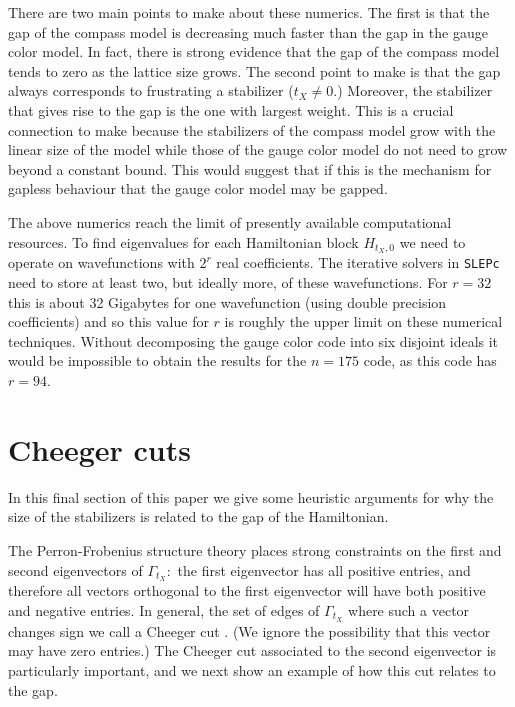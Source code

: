 \documentclass[11pt,oneside]{article}
\begin{document}
There are two main points to make about these numerics.
The first is that the gap of the compass model 
is decreasing much faster than the gap in the gauge color model.
In fact, there is strong evidence \cite{Dorier2005} 
that the gap of the compass model
tends to zero as the lattice size grows.
The second point to make
is that the gap always corresponds to frustrating
a stabilizer ($t_X\ne 0.$) 
Moreover, the stabilizer that
gives rise to the gap is the one with largest weight.
This is a crucial connection to make because the
stabilizers of the compass model grow with the linear
size of the model
while those of the gauge color model
do not need to grow beyond a constant bound.
This would suggest that if this is the mechanism for
gapless behaviour that the gauge color model may
be gapped.

The above numerics reach the limit of presently available 
computational resources.
To find eigenvalues for each Hamiltonian block $H_{t_X,0}$
we need to operate on wavefunctions with $2^r$ real coefficients.
The iterative solvers in {\tt SLEPc} need to store at least two,
but ideally more, of these wavefunctions.
For $r=32$ this is about 32 Gigabytes for one wavefunction (using double
precision coefficients) and so this value for $r$ is roughly the
upper limit on these numerical techniques.
Without decomposing the gauge color code into six disjoint ideals
it would be impossible to obtain the results for the $n=175$ code,
as this code has $r=94$.


\section{Cheeger cuts}

In this final section of this paper 
we give some heuristic
arguments for why the size of the stabilizers is
related to the gap of the Hamiltonian. 

The Perron-Frobenius structure theory places
strong constraints on the first and second
eigenvectors of $\Gamma_{t_X}:$
the first eigenvector has all positive entries,
and therefore all vectors orthogonal to the first
eigenvector will have both positive and negative entries.
In general, the set of edges of $\Gamma_{t_X}$ where
such a vector changes sign we call a Cheeger cut 
\cite{Cheeger1970,Chung1997}.
(We ignore the possibility that this vector
may have zero entries.)
The Cheeger cut associated to the second eigenvector
is particularly important, and we next show an
example of how this cut relates to the gap.
\end{document}
